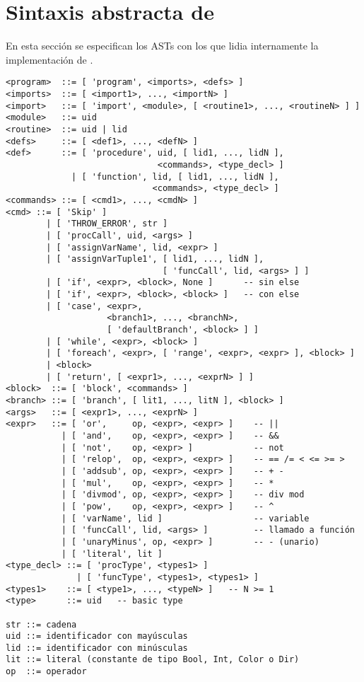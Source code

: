 \documentclass{article}
\begin{document}
\newpage
\section{Sintaxis abstracta de \Gbs}

En esta secci\'on se especifican los ASTs con los que lidia internamente
la implementaci\'on de \PGbs.

\begin{verbatim}
<program>  ::= [ 'program', <imports>, <defs> ]
<imports>  ::= [ <import1>, ..., <importN> ]
<import>   ::= [ 'import', <module>, [ <routine1>, ..., <routineN> ] ]
<module>   ::= uid
<routine>  ::= uid | lid
<defs>     ::= [ <def1>, ..., <defN> ]
<def>      ::= [ 'procedure', uid, [ lid1, ..., lidN ],
                              <commands>, <type_decl> ]
             | [ 'function', lid, [ lid1, ..., lidN ],
                             <commands>, <type_decl> ]
<commands> ::= [ <cmd1>, ..., <cmdN> ]
<cmd> ::= [ 'Skip' ]
        | [ 'THROW_ERROR', str ]
        | [ 'procCall', uid, <args> ]
        | [ 'assignVarName', lid, <expr> ]
        | [ 'assignVarTuple1', [ lid1, ..., lidN ],
                               [ 'funcCall', lid, <args> ] ]
        | [ 'if', <expr>, <block>, None ]      -- sin else
        | [ 'if', <expr>, <block>, <block> ]   -- con else
        | [ 'case', <expr>,
                    <branch1>, ..., <branchN>,
                    [ 'defaultBranch', <block> ] ]
        | [ 'while', <expr>, <block> ]
        | [ 'foreach', <expr>, [ 'range', <expr>, <expr> ], <block> ]
        | <block>
        | [ 'return', [ <expr1>, ..., <exprN> ] ]
<block>  ::= [ 'block', <commands> ]
<branch> ::= [ 'branch', [ lit1, ..., litN ], <block> ]
<args>   ::= [ <expr1>, ..., <exprN> ]
<expr>   ::= [ 'or',     op, <expr>, <expr> ]    -- ||
           | [ 'and',    op, <expr>, <expr> ]    -- &&
           | [ 'not',    op, <expr> ]            -- not
           | [ 'relop',  op, <expr>, <expr> ]    -- == /= < <= >= >
           | [ 'addsub', op, <expr>, <expr> ]    -- + -
           | [ 'mul',    op, <expr>, <expr> ]    -- *
           | [ 'divmod', op, <expr>, <expr> ]    -- div mod
           | [ 'pow',    op, <expr>, <expr> ]    -- ^
           | [ 'varName', lid ]                  -- variable
           | [ 'funcCall', lid, <args> ]         -- llamado a función
           | [ 'unaryMinus', op, <expr> ]        -- - (unario)
           | [ 'literal', lit ]
<type_decl> ::= [ 'procType', <types1> ]
              | [ 'funcType', <types1>, <types1> ]
<types1>    ::= [ <type1>, ..., <typeN> ]   -- N >= 1
<type>      ::= uid   -- basic type

str ::= cadena
uid ::= identificador con mayúsculas
lid ::= identificador con minúsculas
lit ::= literal (constante de tipo Bool, Int, Color o Dir)
op  ::= operador
\end{verbatim}
\end{document}
